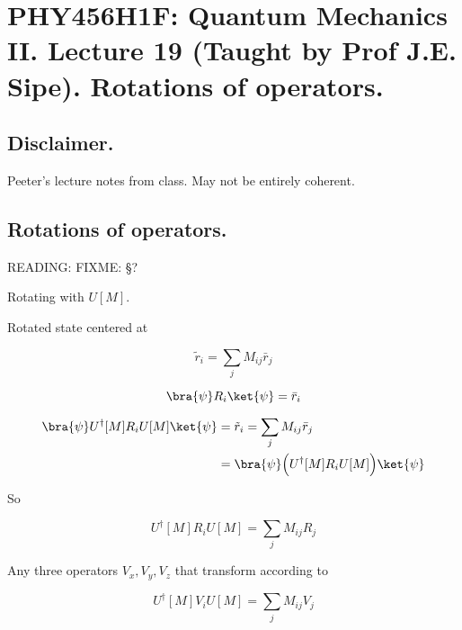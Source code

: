 
%

\chapter{PHY456H1F: Quantum Mechanics II.  Lecture 19 (Taught by Prof J.E. Sipe).  Rotations of operators.}
\label{chap:qmTwoL19}
{}
\date{Nov 16, 2011}

\beginArtWithToc

\section{Disclaimer.}

Peeter's lecture notes from class.  May not be entirely coherent.

\section{Rotations of operators.}

READING: FIXME: \S ? \cite{desai2009quantum}

Rotating with $U[M]$.

Rotated state centered at

\begin{equation}\label{eqn:qmTwoL19:n}
\tilde{r}_i = \sum_j M_{ij} \bar{r}_j
\end{equation}

\begin{equation}\label{eqn:qmTwoL19:n}
\bra{\psi} R_i \ket{\psi} = \bar{r}_i
\end{equation}

\begin{align*}
\bra{\psi} U^\dagger[M] R_i U[M] \ket{\psi}
&= \tilde{r}_i = \sum_j M_{ij} \bar{r}_j \\
&=
\bra{\psi} \Bigl( U^\dagger[M] R_i U[M] \Bigr) \ket{\psi}
\end{align*}

So

\begin{equation}\label{eqn:qmTwoL19:n}
U^\dagger[M] R_i U[M] = \sum_j M_{ij} R_j
\end{equation}

Any three operators $V_x, V_y, V_z$ that transform according to

\begin{equation}\label{eqn:qmTwoL19:n}
U^\dagger[M] V_i U[M] = \sum_j M_{ij} V_j
\end{equation}

